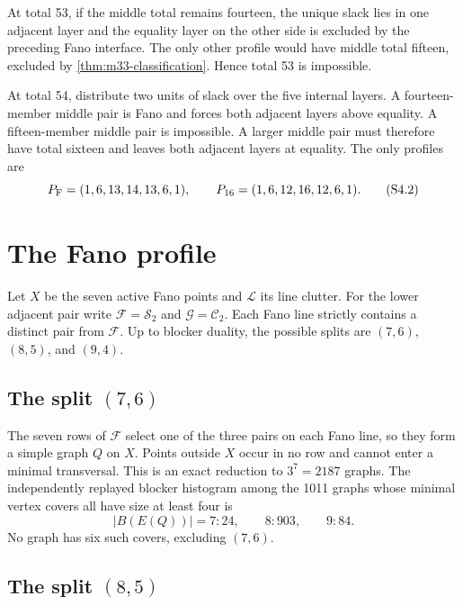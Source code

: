 \documentclass[11pt,a4paper]{article}
\theoremstyle{definition}
\newcommand{\blocker}{B}
\begin{document}
At total 53, if the middle total remains fourteen, the unique slack lies in
one adjacent layer and the equality layer on the other side is excluded by
the preceding Fano interface.  The only other profile would have middle
total fifteen, excluded by \cref{thm:m33-classification}.  Hence total 53 is
impossible.

At total 54, distribute two units of slack over the five internal layers.
A fourteen-member middle pair is Fano and forces both adjacent layers above
equality.  A fifteen-member middle pair is impossible.  A larger middle
pair must therefore have total sixteen and leaves both adjacent layers at
equality.  The only profiles are
\[
 P_{\rm F}=(1,6,13,14,13,6,1),\qquad
 P_{16}=(1,6,12,16,12,6,1).             \tag{S4.2}
\]

\section{The Fano profile}
\label{sec:fano-profile}

Let $X$ be the seven active Fano points and $\mathcal L$ its line clutter.
For the lower adjacent pair write $\mathcal F=\mathcal S_2$ and
$\mathcal G=\mathcal C_2$.  Each Fano line strictly contains a distinct pair
from $\mathcal F$.  Up to blocker duality, the possible splits are
$(7,6)$, $(8,5)$, and $(9,4)$.

\subsection{The split \texorpdfstring{$(7,6)$}{(7,6)}}

The seven rows of $\mathcal F$ select one of the three pairs on each Fano
line, so they form a simple graph $Q$ on $X$.  Points outside $X$ occur in no
row and cannot enter a minimal transversal.  This is an exact reduction to
$3^7=2187$ graphs.  The independently replayed blocker histogram among the
1011 graphs whose minimal vertex covers all have size at least four is
\[
 |\blocker(E(Q))|=7:24,\qquad8:903,\qquad9:84.             \tag{S5.1}
\]
No graph has six such covers, excluding $(7,6)$.

\subsection{The split \texorpdfstring{$(8,5)$}{(8,5)}}
\end{document}
